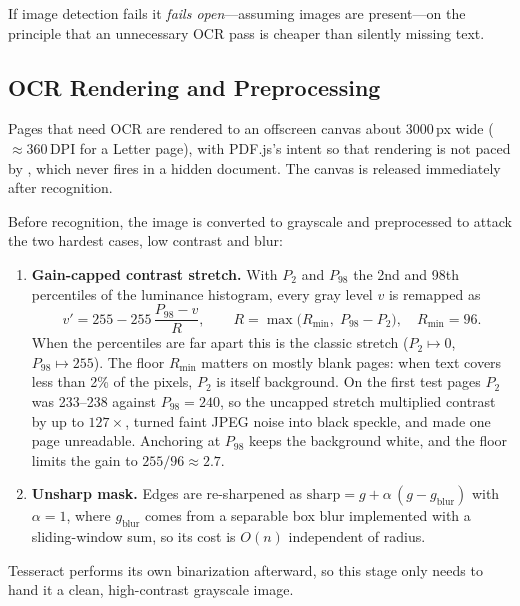 If image detection fails it \emph{fails open}---assuming images are present---on
the principle that an unnecessary OCR pass is cheaper than silently missing text.

\subsection{OCR Rendering and Preprocessing}
Pages that need OCR are rendered to an offscreen canvas about 3000\,px wide
($\approx$360\,DPI for a Letter page), with PDF.js's  intent so that
rendering is not paced by , which never fires in a
hidden document. The canvas is released immediately after recognition.

Before recognition, the image is converted to grayscale and preprocessed to
attack the two hardest cases, low contrast and blur:
\begin{enumerate}
  \item \textbf{Gain-capped contrast stretch.} With $P_{2}$ and $P_{98}$ the 2nd
        and 98th percentiles of the luminance histogram, every gray level $v$ is
        remapped as
        \begin{equation}
          v' = 255 - 255\,\frac{P_{98} - v}{R},
          \qquad
          R = \max\bigl(R_{\min},\; P_{98} - P_{2}\bigr),
          \quad R_{\min} = 96 .
          \label{eq:stretch}
        \end{equation}
        When the percentiles are far apart this is the classic stretch
        ($P_2\mapsto 0$, $P_{98}\mapsto 255$). The floor $R_{\min}$ matters on
        mostly blank pages: when text covers less than 2\% of the pixels, $P_2$
        is itself background. On the first test pages $P_2$ was 233--238 against
        $P_{98}=240$, so the uncapped stretch multiplied contrast by up to
        $127\times$, turned faint JPEG noise into black speckle, and made one page
        unreadable. Anchoring at $P_{98}$ keeps the background white, and the
        floor limits the gain to $255/96 \approx 2.7$.
  \item \textbf{Unsharp mask.} Edges are re-sharpened as
        $\text{sharp} = g + \alpha\,(g - g_{\text{blur}})$ with $\alpha=1$, where
        $g_{\text{blur}}$ comes from a separable box blur implemented with a
        sliding-window sum, so its cost is $O(n)$ independent of radius.
\end{enumerate}
Tesseract performs its own binarization afterward, so this stage only needs to
hand it a clean, high-contrast grayscale image.

